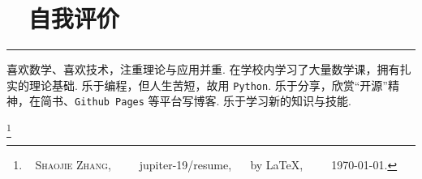 \documentclass[a4paper, 11pt]{ctexart}
\newcommand\blfootnote[1]{%
	\begingroup
	\renewcommand\thefootnote{}\footnote{#1}%
	\addtocounter{footnote}{-1}%
	\endgroup
}
\begin{document}
\vspace{-1cm}

\section*{\faPaperPlane ~ 自我评价} \vspace{-0.25cm}\hrule
{\small \qquad 
喜欢数学、喜欢技术，注重理论与应用并重. 在学校内学习了大量数学课，拥有扎实的理论基础.
乐于编程，但人生苦短，故用 \texttt{Python}. 乐于分享，欣赏“开源”精神，在简书、\texttt{Github Pages} 等平台写博客. 乐于学习新的知识与技能.
}


\blfootnote{
	\color{mygray2}
	\faCopyright ~ \textsc{Shaojie Zhang}, ~~
	\faGithub ~ jupiter-19/resume, ~~ by \LaTeX, ~~
	\faCalendar ~ \today.
}
\end{document}
